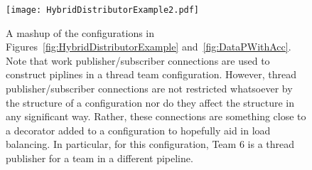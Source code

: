 \documentclass{article}
\newcommand{\qsaa}                   {action\ }                 %
\newcommand{\actionroutinebundle}  {\qsaa routine bundle\xspace}  %
\newcommand{\taskroutine}        {task routine\xspace}
\begin{document}
\begin{appendices}
\begin{figure}[!hp]
\begin{center}
\texttt{[image: HybridDistributorExample2.pdf]}
\caption[]{A mashup of the configurations in
Figures~\ref{fig:HybridDistributorExample} and~\ref{fig:DataPWithAcc}.  Note
that work publisher/subscriber connections are used to construct piplines in a
thread team configuration.  However, thread publisher/subscriber connections are
not restricted whatsoever by the structure of a configuration nor do they affect
the structure in any significant way.  Rather, these connections are something
close to a decorator added to a configuration to hopefully aid in load
balancing.  In particular, for this configuration, Team 6 is a thread publisher for a
team in a different pipeline.}
\label{fig:HybridDistConfig2}
\end{center}
\end{figure}


\end{appendices}


\end{document}
